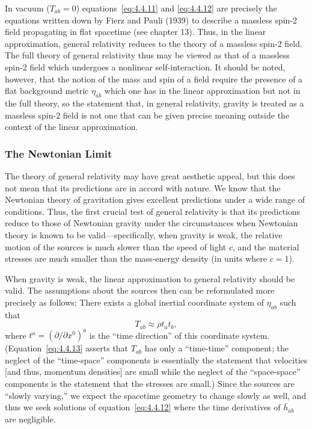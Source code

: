 In vacuum (\(T_{ab}=0\)) equations~\eqref{eq:4.4.11} and \eqref{eq:4.4.12}
are precisely the equations written down by Fierz and Pauli (1939) to describe a
massless spin-2 field propagating in flat spacetime (see chapter 13). Thus, in the
linear approximation, general relativity reduces to the theory of a massless spin-2
field. The full theory of general relativity thus may be viewed as that of a massless
spin-2 field which undergoes a nonlinear self-interaction. It should be noted,
however, that the notion of the mass and spin of a field require the presence of a
flat background metric \(\eta_{ab}\) which one has in the linear approximation but
not in the full theory, so the statement that, in general relativity, gravity is treated
as a massless spin-2 field is not one that can be given precise meaning outside the
context of the linear approximation.

\subsubsection*{The Newtonian Limit}

The theory of general relativity may have great aesthetic appeal, but this does not
mean that its predictions are in accord with nature. We know that the Newtonian
theory of gravitation gives excellent predictions under a wide range of conditions.
Thus, the first crucial test of general relativity is that its predictions reduce to those
of Newtonian gravity under the circumstances when Newtonian theory is known to
be valid---specifically, when gravity is weak, the relative motion of the sources is
much slower than the speed of light \(c\), and the material stresses are much smaller
than the mass-energy density (in units where \(c=1\)).

When gravity is weak, the linear approximation to general relativity should be
valid. The assumptions about the sources then can be reformulated more precisely
as follows: There exists a global inertial coordinate system of \(\eta_{ab}\) such
that
\begin{equation}
  T_{ab}\approx\rho t_at_b ,
  \tag{4.4.13}\label{eq:4.4.13}
\end{equation}
where \(t^a=(\partial/\partial x^0)^a\) is the ``time direction'' of this coordinate
system. (Equation~\eqref{eq:4.4.13} asserts that \(T_{ab}\) has only a
``time-time'' component; the neglect of the ``time-space'' components is essentially
the statement that velocities [and thus, momentum densities] are small while the
neglect of the ``space-space'' components is the statement that the stresses are
small.) Since the sources are ``slowly varying,'' we expect the spacetime geometry
to change slowly as well, and thus we seek solutions of equation~\eqref{eq:4.4.12}
where the time derivatives of \(\bar h_{ab}\) are negligible.

